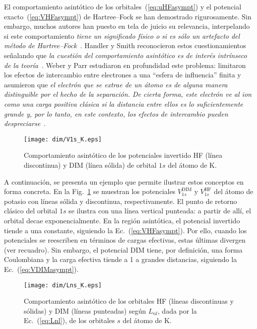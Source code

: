 El comportamiento asintótico de los orbitales~(\ref{eq:uHFasympt}) y el 
potencial exacto~(\ref{eq:VHFasympt}) de Hartree--Fock se han demostrado 
rigurosamente. Sin embargo, muchos autores han puesto en tela de juicio 
su relevancia, interpelando si este comportamiento \textit{tiene un 
significado físico o si es sólo un artefacto del método de 
Hartree--Fock}\myfnote{}~\cite{Handy:69}. Handler y Smith reconocieron 
estos cuestionamientos señalando que \textit{la cuestión del 
comportamiento asintótico es de interés intrínseco de la 
teoría}\myfnote{}~\cite{Handler:80}. Weber y Parr estudiaron en 
profundidad este problema: limitaron los efectos de intercambio entre 
electrones a una ``esfera de influencia'' finita y asumieron que 
\textit{el electrón que se extrae de un átomo es de alguna manera 
distinguible por el hecho de la separación. De cierta 
forma, este electrón ve al ion como una carga positiva clásica si la 
distancia entre ellos es lo suficientemente grande y, por lo tanto, en 
este contexto, los efectos de intercambio pueden 
despreciarse}\myfnote{}~\cite{Weber:71}.

\begin{figure}
\centering
\texttt{[image: dim/V1s\_K.eps]} 
\caption[Comportamiento asintótico de los potenciales.]
{Comportamiento asintótico de los potenciales invertido HF (línea 
discontinua) y DIM (línea sólida) de orbital $1s$ del átomo de K.}
\label{fig:V1sK}
\end{figure}

A continuación, se presenta un ejemplo que permite ilustrar estos 
conceptos en forma concreta. En la Fig.~\ref{fig:V1sK} se muestran los 
potenciales $V_{1s}^{\mathrm{DIM}}$ y $V_{1s}^{\mathrm{HF}}$ del átomo 
de potasio con líneas sólida y discontinua, respectivamente. El punto de 
retorno clásico del orbital $1s$ se ilustra con una línea vertical 
punteada: a partir de allí, el orbital decae exponencialmente. En la 
región asintótica, el potencial invertido tiende a una constante, 
siguiendo la Ec.~(\ref{eq:VHFasympt}). Por ello, cuando los potenciales 
se reescriben en términos de cargas efectivas, estas últimas divergen 
(ver recuadro). Sin embargo, el potencial DIM tiene, por definición, una 
forma Coulombiana y la carga efectiva tiende a 1 a grandes distancias, 
siguiendo la Ec.~(\ref{eq:VDIMasympt}).

\begin{figure}[t]
\centering
\texttt{[image: dim/Lns\_K.eps]} 
\caption[Comportamiento asintótico de los orbitales HF.]
{Comportamiento asintótico de los orbitales HF (líneas discontinuas y 
sólidas) y DIM (líneas punteadas) según $L_{nl}$, dada por la 
Ec.~(\ref{eq:Lnl}), de los orbitales $s$ del átomo de K.}
\label{fig:LnsK}
\end{figure}

